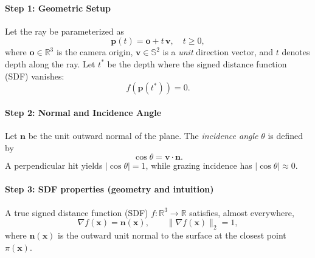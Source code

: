\begin{enrichment}
\begin{enrichment}
        \paragraph{Step 1: Geometric Setup}
        Let the ray be parameterized as
        \begin{equation}
            \mathbf{p}(t) = \mathbf{o} + t\,\mathbf{v}, \quad t \geq 0,
        \end{equation}
        where $\mathbf{o} \in \mathbb{R}^3$ is the camera origin, $\mathbf{v} \in \mathbb{S}^2$ is a \emph{unit} direction vector, and $t$ denotes depth along the ray. Let $t^*$ be the depth where the signed distance function (SDF) vanishes:
        \begin{equation}
            f(\mathbf{p}(t^*)) = 0.
        \end{equation}
        
        \paragraph{Step 2: Normal and Incidence Angle}
        Let $\mathbf{n}$ be the unit outward normal of the plane. The \emph{incidence angle} $\theta$ is defined by
        \begin{equation}
            \cos\theta = \mathbf{v} \cdot \mathbf{n}.
        \end{equation}
        A perpendicular hit yields $|\cos\theta| = 1$, while grazing incidence has $|\cos\theta| \approx 0$.
        
        \paragraph{Step 3: SDF properties (geometry and intuition)}
        A true signed distance function (SDF) $f:\mathbb{R}^3 \to \mathbb{R}$ satisfies, almost everywhere,
        \begin{equation}
            \nabla f(\mathbf{x}) = \mathbf{n}(\mathbf{x}), 
            \qquad \|\nabla f(\mathbf{x})\|_2 = 1,
        \end{equation}
        where $\mathbf{n}(\mathbf{x})$ is the outward unit normal to the surface at the closest point $\pi(\mathbf{x})$.
        

\end{enrichment}
\end{enrichment}
